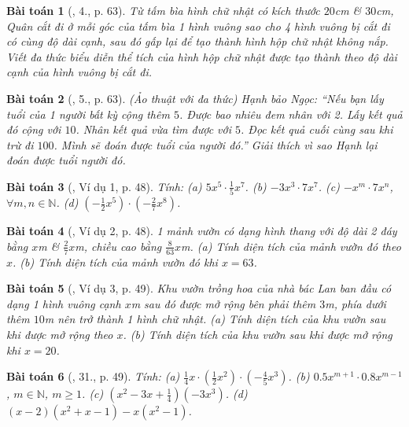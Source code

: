 \documentclass{article}
\newtheorem{baitoan}{Bài toán}
\begin{document}
\begin{baitoan}[\cite{SGK_Toan_7_Canh_Dieu_tap_2}, 4., p. 63]
	Từ tấm bìa hình chữ nhật có kích thước $20$\emph{cm} \& $30$\emph{cm}, Quân cắt đi ở mỗi góc của tấm bìa 1 hình vuông sao cho 4 hình vuông bị cắt đi có cùng độ dài cạnh, sau đó gấp lại để tạo thành hình hộp chữ nhật không nắp. Viết đa thức biểu diễn thể tích của hình hộp chữ nhật được tạo thành theo độ dài cạnh của hình vuông bị cắt đi.
\end{baitoan}

\begin{baitoan}[\cite{SGK_Toan_7_Canh_Dieu_tap_2}, 5., p. 63]
	\emph{(Ảo thuật với đa thức)} Hạnh bảo Ngọc: ``Nếu bạn lấy tuổi của 1 người bất kỳ cộng thêm $5$. Được bao nhiêu đem nhân với 2. Lấy kết quả đó cộng với $10$. Nhân kết quả vừa tìm được với $5$. Đọc kết quả cuối cùng sau khi trừ đi $100$. Mình sẽ đoán được tuổi của người đó.'' Giải thích vì sao Hạnh lại đoán được tuổi người đó.
\end{baitoan}

\begin{baitoan}[\cite{SBT_Toan_7_Canh_Dieu_tap_2}, Ví dụ 1, p. 48]
	Tính: (a) $5x^5\cdot\frac{1}{5}x^7$. (b) $-3x^3\cdot7x^7$. (c) $-x^m\cdot7x^n$, $\forall m,n\in\mathbb{N}$. (d) $\left(-\frac{1}{2}x^5\right)\cdot\left(-\frac{2}{7}x^8\right)$.
\end{baitoan}

\begin{baitoan}[\cite{SBT_Toan_7_Canh_Dieu_tap_2}, Ví dụ 2, p. 48]
	1 mảnh vườn có dạng hình thang với độ dài 2 đáy bằng $x$\emph{m} \& $\frac{2}{7}x$\emph{m}, chiều cao bằng $\frac{8}{63}x$\emph{m}. (a) Tính diện tích của mảnh vườn đó theo $x$. (b) Tính diện tích của mảnh vườn đó khi $x = 63$.
\end{baitoan}

\begin{baitoan}[\cite{SBT_Toan_7_Canh_Dieu_tap_2}, Ví dụ 3, p. 49]
	Khu vườn trồng hoa của nhà bác Lan ban đầu có dạng 1 hình vuông cạnh $x$\emph{m} sau đó được mở rộng bên phải thêm $3$\emph{m}, phía dưới thêm $10$\emph{m} nên trở thành 1 hình chữ nhật. (a) Tính diện tích của khu vườn sau khi được mở rộng theo $x$. (b) Tính diện tích của khu vườn sau khi được mở rộng khi $x = 20$.
\end{baitoan}

\begin{baitoan}[\cite{SBT_Toan_7_Canh_Dieu_tap_2}, 31., p. 49]
	Tính: (a) $\frac{1}{4}x\cdot\left(\frac{1}{2}x^2\right)\cdot\left(-\frac{4}{5}x^3\right)$. (b) $0.5x^{m+1}\cdot0.8x^{m-1}$, $m\in\mathbb{N}$, $m\ge1$. (c) $\left(x^2 - 3x + \frac{1}{4}\right)(-3x^3)$. (d) $(x - 2)(x^2 + x - 1) - x(x^2 - 1)$.
\end{baitoan}
\end{document}

